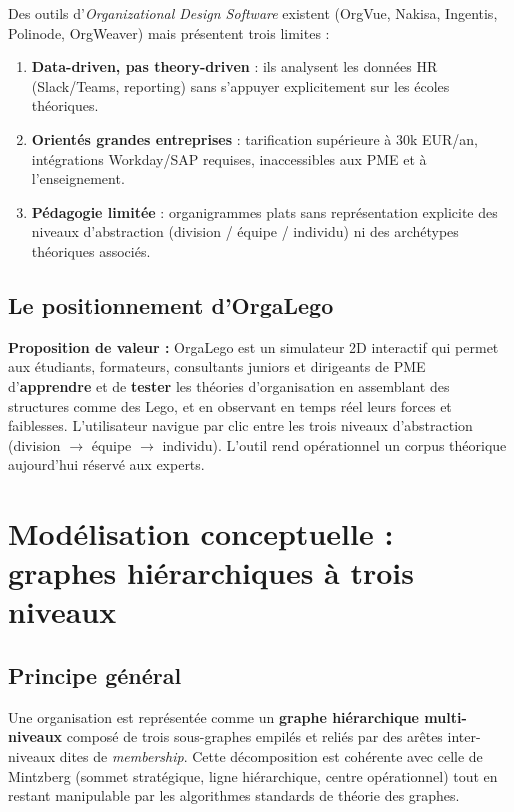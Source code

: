 \documentclass[11pt,a4paper]{article}
\begin{document}
Des outils d'\textit{Organizational Design Software} existent (OrgVue, Nakisa, Ingentis, Polinode, OrgWeaver) mais présentent trois limites :

\begin{enumerate}[leftmargin=*]
    \item \textbf{Data-driven, pas theory-driven} : ils analysent les données HR (Slack/Teams, reporting) sans s'appuyer explicitement sur les écoles théoriques.
    \item \textbf{Orientés grandes entreprises} : tarification supérieure à 30k EUR/an, intégrations Workday/SAP requises, inaccessibles aux PME et à l'enseignement.
    \item \textbf{Pédagogie limitée} : organigrammes plats sans représentation explicite des niveaux d'abstraction (division / équipe / individu) ni des archétypes théoriques associés.
\end{enumerate}

\subsection{Le positionnement d'OrgaLego}

\begin{solutionbox}
\textbf{Proposition de valeur :} OrgaLego est un simulateur 2D interactif qui permet aux étudiants, formateurs, consultants juniors et dirigeants de PME d'\textbf{apprendre} et de \textbf{tester} les théories d'organisation en assemblant des structures comme des Lego, et en observant en temps réel leurs forces et faiblesses. L'utilisateur navigue par clic entre les trois niveaux d'abstraction (division $\to$ équipe $\to$ individu). L'outil rend opérationnel un corpus théorique aujourd'hui réservé aux experts.
\end{solutionbox}

\section{Modélisation conceptuelle : graphes hiérarchiques à trois niveaux}

\subsection{Principe général}

Une organisation est représentée comme un \textbf{graphe hiérarchique multi-niveaux} composé de trois sous-graphes empilés et reliés par des arêtes inter-niveaux dites de \textit{membership}. Cette décomposition est cohérente avec celle de Mintzberg (sommet stratégique, ligne hiérarchique, centre opérationnel) tout en restant manipulable par les algorithmes standards de théorie des graphes.
\end{document}
